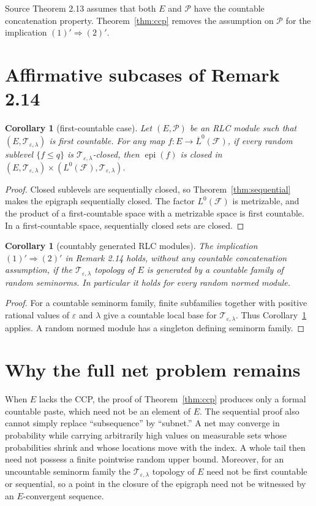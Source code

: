 \documentclass[11pt]{article}
\newtheorem{corollary}[theorem]{Corollary}
\newcommand{\Lzero}{L^0(\mathcal F)}
\newcommand{\Tep}{\mathcal T_{\varepsilon,\lambda}}
\newcommand{\epi}{\operatorname{epi}}
\begin{document}
Source Theorem 2.13 assumes that both $E$ and $\mathcal P$ have the
countable concatenation property.  Theorem~\ref{thm:ccp} removes the
assumption on $\mathcal P$ for the implication $(1)'\Rightarrow(2)'$.

\section{Affirmative subcases of Remark 2.14}

\begin{corollary}[first-countable case]
\label{cor:firstcountable}
Let $(E,\mathcal P)$ be an RLC module such that $(E,\Tep)$ is first
countable.  For any map $f:E\to\overline L^0(\mathcal F)$, if every random
sublevel $\{f\leq q\}$ is $\Tep$-closed, then $\epi(f)$ is closed in
$(E,\Tep)\times(\Lzero,\Tep)$.
\end{corollary}

\begin{proof}
Closed sublevels are sequentially closed, so
Theorem~\ref{thm:sequential} makes the epigraph sequentially closed.  The
factor $\Lzero$ is metrizable, and the product of a first-countable space
with a metrizable space is first countable.  In a first-countable space,
sequentially closed sets are closed.
\end{proof}

\begin{corollary}[countably generated RLC modules]
The implication $(1)'\Rightarrow(2)'$ in Remark 2.14 holds, without any
countable concatenation assumption, if the $\Tep$ topology of $E$ is
generated by a countable family of random seminorms.  In particular it holds
for every random normed module.
\end{corollary}

\begin{proof}
For a countable seminorm family, finite subfamilies together with positive
rational values of $\varepsilon$ and $\lambda$ give a countable local base
for $\Tep$.  Thus Corollary~\ref{cor:firstcountable} applies.  A random normed
module has a singleton defining seminorm family.
\end{proof}

\section{Why the full net problem remains}

When $E$ lacks the CCP, the proof of Theorem~\ref{thm:ccp} produces only a
formal countable paste, which need not be an element of $E$.  The sequential
proof also cannot simply replace ``subsequence'' by ``subnet.''  A net
may converge in probability while carrying arbitrarily high values on
measurable sets whose probabilities shrink and whose locations move with the
index.  A whole tail then need not possess a finite pointwise random upper
bound.  Moreover, for an uncountable seminorm family the $\Tep$ topology of
$E$ need not be first countable or sequential, so a point in the closure of
the epigraph need not be witnessed by an $E$-convergent sequence.
\end{document}
